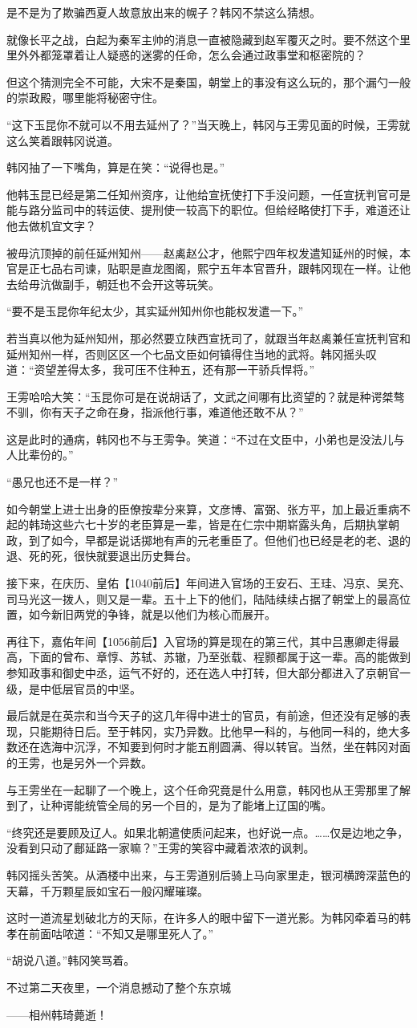 是不是为了欺骗西夏人故意放出来的幌子？韩冈不禁这么猜想。

就像长平之战，白起为秦军主帅的消息一直被隐藏到赵军覆灭之时。要不然这个里里外外都笼罩着让人疑惑的迷雾的任命，怎么会通过政事堂和枢密院的？

但这个猜测完全不可能，大宋不是秦国，朝堂上的事没有这么玩的，那个漏勺一般的崇政殿，哪里能将秘密守住。

“这下玉昆你不就可以不用去延州了？”当天晚上，韩冈与王雱见面的时候，王雱就这么笑着跟韩冈说道。

韩冈抽了一下嘴角，算是在笑：“说得也是。”

他韩玉昆已经是第二任知州资序，让他给宣抚使打下手没问题，一任宣抚判官可是能与路分监司中的转运使、提刑使一较高下的职位。但给经略使打下手，难道还让他去做机宜文字？

被毋沆顶掉的前任延州知州——赵禼赵公才，他熙宁四年权发遣知延州的时候，本官是正七品右司谏，贴职是直龙图阁，熙宁五年本官晋升，跟韩冈现在一样。让他去给毋沆做副手，朝廷也不会开这等玩笑。

“要不是玉昆你年纪太少，其实延州知州你也能权发遣一下。”

若当真以他为延州知州，那必然要立陕西宣抚司了，就跟当年赵禼兼任宣抚判官和延州知州一样，否则区区一个七品文臣如何镇得住当地的武将。韩冈摇头叹道：“资望差得太多，我可压不住种五，还有那一干骄兵悍将。”

王雱哈哈大笑：“玉昆你可是在说胡话了，文武之间哪有比资望的？就是种谔桀骜不驯，你有天子之命在身，指派他行事，难道他还敢不从？”

这是此时的通病，韩冈也不与王雱争。笑道：“不过在文臣中，小弟也是没法儿与人比辈份的。”

“愚兄也还不是一样？”

如今朝堂上进士出身的臣僚按辈分来算，文彦博、富弼、张方平，加上最近重病不起的韩琦这些六七十岁的老臣算是一辈，皆是在仁宗中期崭露头角，后期执掌朝政，到了如今，早都是说话掷地有声的元老重臣了。但他们也已经是老的老、退的退、死的死，很快就要退出历史舞台。

接下来，在庆历、皇佑【1040前后】年间进入官场的王安石、王珪、冯京、吴充、司马光这一拨人，则又是一辈。五十上下的他们，陆陆续续占据了朝堂上的最高位置，如今新旧两党的争锋，就是以他们为核心而展开。

再往下，嘉佑年间【1056前后】入官场的算是现在的第三代，其中吕惠卿走得最高，下面的曾布、章惇、苏轼、苏辙，乃至张载、程颢都属于这一辈。高的能做到参知政事和御史中丞，运气不好的，还在选人中打转，但大部分都进入了京朝官一级，是中低层官员的中坚。

最后就是在英宗和当今天子的这几年得中进士的官员，有前途，但还没有足够的表现，只能期待日后。至于韩冈，实乃异数。比他早一科的，与他同一科的，绝大多数还在选海中沉浮，不知要到何时才能五削圆满、得以转官。当然，坐在韩冈对面的王雱，也是另外一个异数。

与王雱坐在一起聊了一个晚上，这个任命究竟是什么用意，韩冈也从王雱那里了解到了，让种谔能统管全局的另一个目的，是为了能堵上辽国的嘴。

“终究还是要顾及辽人。如果北朝遣使质问起来，也好说一点。……仅是边地之争，没看到只动了鄜延路一家嘛？”王雱的笑容中藏着浓浓的讽刺。

韩冈摇头苦笑。从酒楼中出来，与王雱道别后骑上马向家里走，银河横跨深蓝色的天幕，千万颗星辰如宝石一般闪耀璀璨。

这时一道流星划破北方的天际，在许多人的眼中留下一道光影。为韩冈牵着马的韩孝在前面咕哝道：“不知又是哪里死人了。”

“胡说八道。”韩冈笑骂着。

不过第二天夜里，一个消息撼动了整个东京城

——相州韩琦薨逝！

